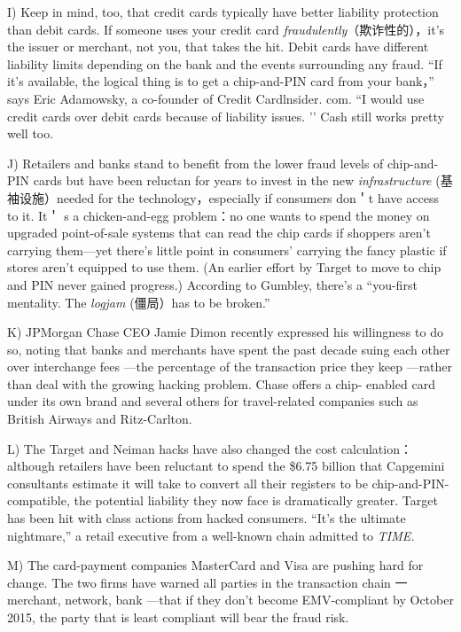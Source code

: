 \documentclass[UTF8,11pt]{ctexart}
\begin{document}
I) Keep in mind, too, that credit cards typically have better liability protection than debit cards. If someone uses your credit card \textit{fraudulently}（欺诈性的），it’s the issuer or merchant, not you, that takes the hit. Debit cards have different liability limits depending on the bank and the events surrounding any fraud. “If it’s available, the logical thing is to get a chip-and-PIN card from your bank，” says Eric Adamowsky, a co-founder of Credit Cardlnsider. com. “I would use credit cards over debit cards because of liability issues. ’’ Cash still works pretty well too.


J) Retailers and banks stand to benefit from the lower fraud levels of chip-and-PIN cards but have been reluctan for years to invest in the new\textit{ infrastructure} (基袖设施）needed for the technology，especially if consumers don＇t have access to it. It＇ s a chicken-and-egg problem：no one wants to spend the money on upgraded point-of-sale systems that can read the chip cards if shoppers aren’t carrying them—yet there’s little point in consumers’ carrying the fancy plastic if stores aren’t equipped to use them. (An earlier effort by Target to move to chip and PIN never gained progress.) According to Gumbley, there’s a “you-first mentality. The\textit{ logjam} (僵局）has to be broken.”


K) JPMorgan Chase CEO Jamie Dimon recently expressed his willingness to do so, noting that banks and merchants have spent the past decade suing each other over interchange fees —the percentage of the transaction price they keep —rather than deal with the growing hacking problem. Chase offers a chip- enabled card under its own brand and several others for travel-related companies such as British Airways and Ritz-Carlton.


L) The Target and Neiman hacks have also changed the cost calculation：although retailers have been reluctant to spend the \$6.75 billion that Capgemini consultants estimate it will take to convert all their registers to be chip-and-PIN-compatible, the potential liability they now face is dramatically greater. Target has been hit with class actions from hacked consumers. “It’s the ultimate nightmare,” a retail executive from a well-known chain admitted to\textit{ TIME.}


M) The card-payment companies MasterCard and Visa are pushing hard for change. The two firms have warned all parties in the transaction chain 一merchant, network, bank —that if they don’t become EMV-compliant by October 2015, the party that is least compliant will bear the fraud risk.
\end{document}
